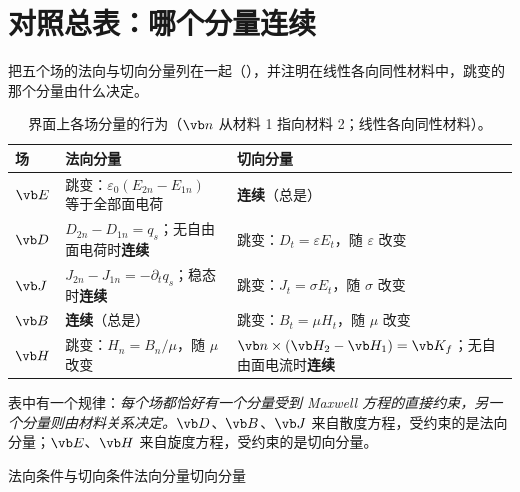 \section{对照总表：哪个分量连续}\label{sec:interfaces-table}

把五个场的法向与切向分量列在一起（），并注明在线性各向同性材料中，跳变的那个分量由什么决定。

\begin{table}[htbp]\centering\small
\caption{界面上各场分量的行为（$\vb n$ 从材料 1 指向材料 2；线性各向同性材料）。}\label{tab:interfaces-summary}
\begin{tabularx}{\linewidth}{@{}l Y Y@{}}
\toprule
场 & 法向分量 & 切向分量\\\midrule
$\vb E$ & 跳变：$\varepsilon_0(E_{2n}-E_{1n})$ 等于全部面电荷 & \textbf{连续}（总是）\\
$\vb D$ & $D_{2n}-D_{1n}=q_s$；无自由面电荷时\textbf{连续} & 跳变：$D_t=\varepsilon E_t$，随 $\varepsilon$ 改变\\
$\vb J$ & $J_{2n}-J_{1n}=-\partial_tq_s$；稳态时\textbf{连续} & 跳变：$J_t=\sigma E_t$，随 $\sigma$ 改变\\
$\vb B$ & \textbf{连续}（总是） & 跳变：$B_t=\mu H_t$，随 $\mu$ 改变\\
$\vb H$ & 跳变：$H_n=B_n/\mu$，随 $\mu$ 改变 & $\vb n\times(\vb H_2-\vb H_1)=\vb K_f$；无自由面电流时\textbf{连续}\\
\bottomrule
\end{tabularx}
\end{table}

表中有一个规律：\emph{每个场都恰好有一个分量受到 Maxwell 方程的直接约束，另一个分量则由材料关系决定。}$\vb D$、$\vb B$、$\vb J$ 来自散度方程，受约束的是法向分量；$\vb E$、$\vb H$ 来自旋度方程，受约束的是切向分量。

\begin{compare}{法向条件与切向条件}{法向分量}{切向分量}
\end{compare}

